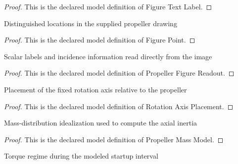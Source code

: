 \begin{proof}
  This is the declared model definition of Figure Text Label.
\end{proof}
\begin{definition}
  \label{def:physics:phyx-mini-0704:phyxminiproblems-problemphyxmini0704-figurepoint}
  Distinguished locations in the supplied propeller drawing
\end{definition}
\begin{proof}
  This is the declared model definition of Figure Point.
\end{proof}
\begin{definition}
  \label{def:physics:phyx-mini-0704:phyxminiproblems-problemphyxmini0704-propellerfigurereadout}
  Scalar labels and incidence information read directly from the image
\end{definition}
\begin{proof}
  This is the declared model definition of Propeller Figure Readout.
\end{proof}
\begin{definition}
  \label{def:physics:phyx-mini-0704:phyxminiproblems-problemphyxmini0704-rotationaxisplacement}
  Placement of the fixed rotation axis relative to the propeller
\end{definition}
\begin{proof}
  This is the declared model definition of Rotation Axis Placement.
\end{proof}
\begin{definition}
  \label{def:physics:phyx-mini-0704:phyxminiproblems-problemphyxmini0704-propellermassmodel}
  Mass-distribution idealization used to compute the axial inertia
\end{definition}
\begin{proof}
  This is the declared model definition of Propeller Mass Model.
\end{proof}
\begin{definition}
  \label{def:physics:phyx-mini-0704:phyxminiproblems-problemphyxmini0704-startuptorqueregime}
  Torque regime during the modeled startup interval
\end{definition}
